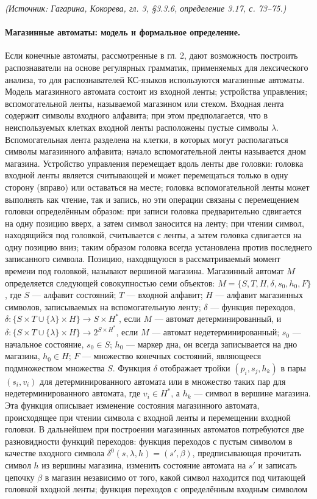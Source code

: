 \documentclass[a4paper,12pt]{article}
\begin{document}
\textit{(Источник: Гагарина, Кокорева, гл. 3, §3.3.6, определение 3.17, с. 73--75.)}

\paragraph{Магазинные автоматы: модель и формальное определение.}
Если конечные автоматы, рассмотренные в гл. 2, дают возможность построить распознаватели на основе регулярных грамматик, применяемых для лексического анализа, то для распознавателей КС-языков используются магазинные автоматы. Модель магазинного автомата состоит из входной ленты; устройства управления; вспомогательной ленты, называемой магазином или стеком. Входная лента содержит символы входного алфавита; при этом предполагается, что в неиспользуемых клетках входной ленты расположены пустые символы \(\lambda\). Вспомогательная лента разделена на клетки, в которых могут располагаться символы магазинного алфавита; начало вспомогательной ленты называется дном магазина. Устройство управления перемещает вдоль ленты две головки: головка входной ленты является считывающей и может перемещаться только в одну сторону (вправо) или оставаться на месте; головка вспомогательной ленты может выполнять как чтение, так и запись, но эти операции связаны с перемещением головки определённым образом: при записи головка предварительно сдвигается на одну позицию вверх, а затем символ заносится на ленту; при чтении символ, находящийся под головкой, считывается с ленты, а затем головка сдвигается на одну позицию вниз; таким образом головка всегда установлена против последнего записанного символа. Позицию, находящуюся в рассматриваемый момент времени под головкой, называют вершиной магазина. Магазинный автомат \(M\) определяется следующей совокупностью семи объектов: \(M=\{S,T,H,\delta,s_0,h_0,F\}\), где \(S\) — алфавит состояний; \(T\) — входной алфавит; \(H\) — алфавит магазинных символов, записываемых на вспомогательную ленту; \(\delta\) — функция переходов, \(\delta:\{S\times T\cup\{\lambda\}\times H\}\to S\times H^*\), если \(M\) — автомат детерминированный, и \(\delta:\{S\times T\cup\{\lambda\}\times H\}\to 2^{S\times H^*}\), если \(M\) — автомат недетерминированный; \(s_0\) — начальное состояние, \(s_0\in S\); \(h_0\) — маркер дна, он всегда записывается на дно магазина, \(h_0\in H\); \(F\) — множество конечных состояний, являющееся подмножеством множества \(S\). Функция \(\delta\) отображает тройки \((p_i,s_j,h_k)\) в пары \((s_i,v_i)\) для детерминированного автомата или в множество таких пар для недетерминированного автомата, где \(v_i\in H^*\), а \(h_k\) — символ в вершине магазина. Эта функция описывает изменение состояния магазинного автомата, происходящее при чтении символа с входной ленты и перемещении входной головки. В дальнейшем при построении магазинных автоматов потребуются две разновидности функций переходов: функция переходов с пустым символом в качестве входного символа \(\delta^0(s,\lambda,h)=(s',\beta)\), предписывающая прочитать символ \(h\) из вершины магазина, изменить состояние автомата на \(s'\) и записать цепочку \(\beta\) в магазин независимо от того, какой символ находится под читающей головкой входной ленты; функция переходов с определённым входным символом 
\end{document}
